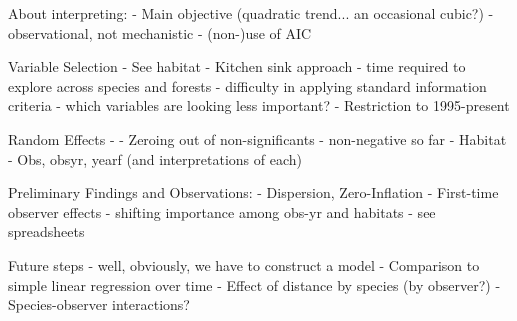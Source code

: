 About interpreting:
- Main objective (quadratic trend... an occasional cubic?)
- observational, not mechanistic
- (non-)use of AIC

Variable Selection
- See habitat
- Kitchen sink approach
  - time required to explore across species and forests
  - difficulty in applying standard information criteria
  - which variables are looking less important?
- Restriction to 1995-present

Random Effects -
- Zeroing out of non-significants
  - non-negative so far
- Habitat
- Obs, obsyr, yearf (and interpretations of each)

Preliminary Findings and Observations:
- Dispersion, Zero-Inflation
- First-time observer effects
- shifting importance among obs-yr and habitats
- see spreadsheets

Future steps
- well, obviously, we have to construct a model
- Comparison to simple linear regression over time
- Effect of distance by species (by observer?)
- Species-observer interactions?
